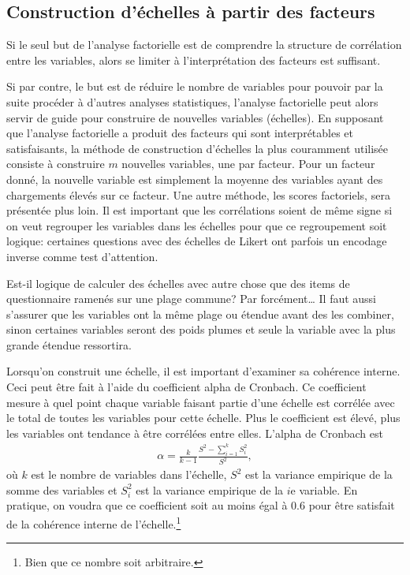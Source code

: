 \documentclass[
  11pt,
  letterpaper,
]{book}
\theoremstyle{definition}
\theoremstyle{remark}
\begin{document}
\hypertarget{construction-duxe9chelles-uxe0-partir-des-facteurs}{%
\subsection{Construction d'échelles à partir des
facteurs}\label{construction-duxe9chelles-uxe0-partir-des-facteurs}}

Si le seul but de l'analyse factorielle est de comprendre la structure
de corrélation entre les variables, alors se limiter à l'interprétation
des facteurs est suffisant.

Si par contre, le but est de réduire le nombre de variables pour pouvoir
par la suite procéder à d'autres analyses statistiques, l'analyse
factorielle peut alors servir de guide pour construire de nouvelles
variables (échelles). En supposant que l'analyse factorielle a produit
des facteurs qui sont interprétables et satisfaisants, la méthode de
construction d'échelles la plus couramment utilisée consiste à
construire \(m\) nouvelles variables, une par facteur. Pour un facteur
donné, la nouvelle variable est simplement la moyenne des variables
ayant des chargements élevés sur ce facteur. Une autre méthode, les
scores factoriels, sera présentée plus loin. Il est important que les
corrélations soient de même signe si on veut regrouper les variables
dans les échelles pour que ce regroupement soit logique: certaines
questions avec des échelles de Likert ont parfois un encodage inverse
comme test d'attention.

Est-il logique de calculer des échelles avec autre chose que des items
de questionnaire ramenés sur une plage commune? Par forcément\ldots{} Il
faut aussi s'assurer que les variables ont la même plage ou étendue
avant des les combiner, sinon certaines variables seront des poids
plumes et seule la variable avec la plus grande étendue ressortira.

Lorsqu'on construit une échelle, il est important d'examiner sa
cohérence interne. Ceci peut être fait à l'aide du coefficient alpha de
Cronbach. Ce coefficient mesure à quel point chaque variable faisant
partie d'une échelle est corrélée avec le total de toutes les variables
pour cette échelle. Plus le coefficient est élevé, plus les variables
ont tendance à être corrélées entre elles. L'alpha de Cronbach est
\begin{align*}
\alpha=\frac{k}{k-1} \frac{S^2-\sum_{i=1}^k S_i^2}{S^2}, 
\end{align*} où \(k\) est le nombre de variables dans l'échelle, \(S^2\)
est la variance empirique de la somme des variables et \(S_i^2\) est la
variance empirique de la \(i\)e variable. En pratique, on voudra que ce
coefficient soit au moins égal à 0.6 pour être satisfait de la cohérence
interne de l'échelle.\footnote{Bien que ce nombre soit arbitraire.}
\end{document}
